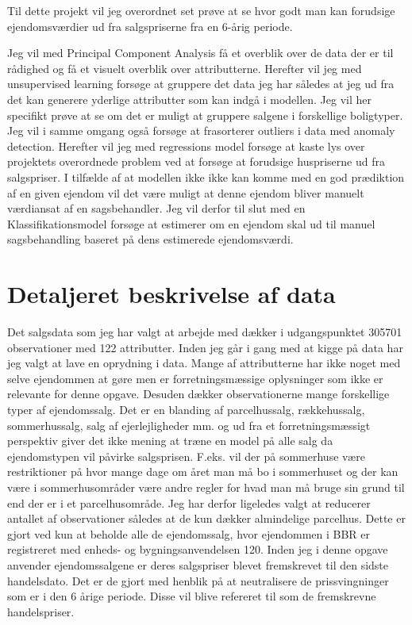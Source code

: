 \documentclass{report}
\begin{document}
Til dette projekt vil jeg overordnet set prøve at se hvor godt man kan forudsige ejendomsværdier ud fra salgspriserne fra en 6-årig periode. 

Jeg vil med Principal Component Analysis få et overblik over de data der er til rådighed og få et visuelt overblik over attributterne. 
Herefter vil jeg med unsupervised learning forsøge at gruppere det data jeg har således at jeg ud fra det kan generere yderlige attributter som kan indgå i modellen. Jeg vil her specifikt prøve at se om det er muligt at gruppere salgene i forskellige boligtyper. Jeg vil i samme omgang også forsøge at frasorterer outliers i data med anomaly detection. 
Herefter vil jeg med regressions model forsøge at kaste lys over projektets overordnede problem ved at forsøge at forudsige huspriserne ud fra salgspriser. I tilfælde af at modellen ikke ikke kan komme med en god prædiktion af en given ejendom vil det være muligt at denne ejendom bliver manuelt værdiansat af en sagsbehandler. Jeg vil derfor til slut med en Klassifikationsmodel forsøge at estimerer om en ejendom skal ud til manuel sagsbehandling baseret på dens estimerede ejendomsværdi.

\section{Detaljeret beskrivelse af data}


Det salgsdata som jeg har valgt at arbejde med dækker i udgangspunktet 305701 observationer med 122 attributter. Inden jeg går i gang med at kigge på data har jeg valgt at lave en oprydning i data.
Mange af attributterne har ikke noget med selve ejendommen at gøre men er forretningsmæssige oplysninger som ikke er relevante for denne opgave. Desuden dækker observationerne mange forskellige typer af ejendomssalg. Det er en blanding af parcelhussalg, rækkehussalg, sommerhussalg, salg af ejerlejligheder mm. og ud fra et forretningsmæssigt perspektiv giver det ikke mening at træne en model på alle salg da ejendomstypen vil påvirke salgsprisen. F.eks. vil der på sommerhuse være restriktioner på hvor mange dage om året man må bo i sommerhuset og der kan være i sommerhusområder være andre regler for hvad man må bruge sin grund til end der er i et parcelhusområde. Jeg har derfor ligeledes valgt at reducerer antallet af observationer således at de kun dækker almindelige parcelhus. Dette er gjort ved kun at beholde alle de ejendomssalg, hvor ejendommen i BBR er registreret med enheds- og bygningsanvendelsen 120. 
Inden jeg i denne opgave anvender ejendomssalgene er deres salgspriser blevet fremskrevet til den sidste handelsdato. Det er de gjort med henblik på at neutralisere de prissvingninger som er i den 6 årige periode. Disse vil blive refereret til som de fremskrevne handelspriser. 
\end{document}
